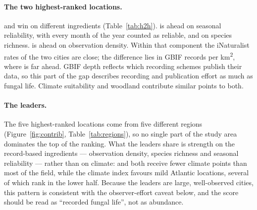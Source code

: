 %
%

\paragraph{The two highest-ranked locations.} \MLSLeaderName{} and \MLSRunnerUpName{} win on different
ingredients (Table~\ref{tab:h2h}). \MLSLeaderName{} is ahead on seasonal reliability, with every month of the
year counted as reliable, and on species richness. \MLSRunnerUpName{} is ahead on observation density. Within
that component the iNaturalist rates of the two cities are close; the difference lies in GBIF records per
km\textsuperscript{2}, where \MLSRunnerUpName{} is far ahead. GBIF depth reflects which recording schemes
publish their data, so this part of the gap describes recording and publication effort as much as fungal life.
Climate suitability and woodland contribute similar points to both.

\paragraph{The leaders.} The five highest-ranked locations come from five different regions
(Figure~\ref{fig:contrib}, Table~\ref{tab:regions}), so no single part of the study area dominates the top of
the ranking. What the leaders share is strength on the record-based ingredients --- observation density,
species richness and seasonal reliability --- rather than on climate: \MLSLeaderName{} and \MLSRunnerUpName{}
both receive fewer climate points than most of the field, while the climate index favours mild Atlantic
locations, several of which rank in the lower half. Because the leaders are large, well-observed cities, this
pattern is consistent with the observer-effort caveat below, and the score should be read as ``recorded fungal
life'', not as abundance.

